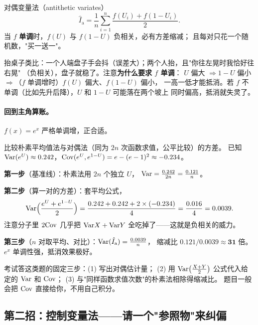 \begin{ebox}{对偶变量法（antithetic variates）}
\[
\hat I_{\text{a}}=\frac1{n}\sum_{i=1}^{n}\frac{f(U_i)+f(1-U_i)}{2}.
\]
当 $f$ \textbf{单调}时，$f(U)$ 与 $f(1-U)$ 负相关，必有方差缩减；
且每对只花一个随机数，"买一送一"。
\end{ebox}

\begin{pbox}
抬桌子类比：一个人端盘子手会抖（误差大）；两个人抬，且"你往左晃时我恰好往右晃"
（负相关），盘子就稳了。注意\textbf{为什么要求 $f$ 单调}：
$U$ 偏大 $\Rightarrow 1-U$ 偏小 $\Rightarrow$（$f$ 单调增时）$f(U)$ 偏大、$f(1-U)$ 偏小，
一高一低才能抵消。若 $f$ 不单调（比如先升后降），$U$ 和 $1-U$ 可能落在两个坡上
同时偏高，抵消就失灵了。
\end{pbox}

\paragraph{回到主角算账。}$f(x)=e^x$ 严格单调增，正合适。

\begin{exbox}
比较朴素平均值法与对偶法（同为 $2n$ 次函数求值，公平比较）的方差。
已知 $\mathrm{Var}(e^U)\approx0.242$，$\mathrm{Cov}(e^U,e^{1-U})=e-(e-1)^2\approx-0.234$。
\end{exbox}
\begin{sol}
\textbf{第一步}（基准线）：朴素法用 $2n$ 个独立 $U$，
$\mathrm{Var}=\frac{0.242}{2n}=\frac{0.121}{n}$。

\textbf{第二步}（算一对的方差）：套平均公式，
\[
\mathrm{Var}\Big(\frac{e^U+e^{1-U}}{2}\Big)=\frac{0.242+0.242+2\times(-0.234)}{4}
=\frac{0.016}{4}=0.0039 .
\]
注意分子里 $2\mathrm{Cov}$ 几乎把 $\mathrm{Var} X+\mathrm{Var} Y$ 全吃掉了——这就是负相关的威力。

\textbf{第三步}（$n$ 对取平均、对比）：$\mathrm{Var}(\hat I_{\text a})=\frac{0.0039}{n}$，
缩减比 $0.121/0.0039\approx\textbf{31 倍}$。
$e^x$ 单调性强，抵消效果极好。
\end{sol}

\begin{pbox}
考试答这类题的固定三步：(1) 写出对偶估计量；
(2) 用 $\mathrm{Var}\big(\frac{X+Y}2\big)$ 公式代入给定的 $\mathrm{Var}$ 和 $\mathrm{Cov}$；
(3) 与"同样函数求值次数"的朴素法相除得缩减比。
题目一般会把 $\mathrm{Cov}$ 直接给你，不用自己积分。
\end{pbox}

\subsection{第二招：控制变量法——请一个"参照物"来纠偏}

